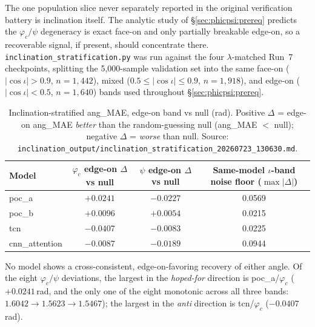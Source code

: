 The one population slice never separately reported in the original verification battery is inclination itself.
The analytic study of \S\ref{sec:phicpsi:prereq} predicts the $\varphi_c/\psi$ degeneracy is exact face-on and only partially breakable edge-on, so a recoverable signal, if present, should concentrate there.
\texttt{inclination\_stratification.py} was run against the four $\lambda$-matched Run~7 checkpoints, splitting the 5{,}000-sample validation set into the same face-on ($|\cos\iota| > 0.9$, $n=1{,}442$), mixed ($0.5 \le |\cos\iota| \le 0.9$, $n=1{,}918$), and edge-on ($|\cos\iota| < 0.5$, $n=1{,}640$) bands used throughout \S\ref{sec:phicpsi:prereq}.

\begin{table}[tbp]
    \centering
    \caption{Inclination-stratified ang\_MAE, edge-on band vs null (rad). Positive $\Delta$ = edge-on ang\_MAE \emph{better} than the random-guessing null (ang\_MAE $<$ null); negative $\Delta$ = \emph{worse} than null.
    Source: \texttt{inclination\_output/inclination\_stratification\_20260723\_130630.md}.}
    \label{tab:phicpsi:inclination}
    \small
    \begin{tabular}{@{}lccc@{}}
        \toprule
        Model & $\varphi_c$ edge-on $\Delta$ vs null & $\psi$ edge-on $\Delta$ vs null & Same-model $\iota$-band noise floor ($\max|\Delta|$) \\
        \midrule
        poc\_a         & $+0.0241$ & $-0.0227$ & 0.0569 \\
        poc\_b         & $+0.0096$ & $+0.0054$ & 0.0215 \\
        tcn            & $-0.0407$ & $-0.0083$ & 0.0225 \\
        cnn\_attention & $-0.0087$ & $-0.0189$ & 0.0944 \\
        \bottomrule
    \end{tabular}
\end{table}

No model shows a cross-consistent, edge-on-favoring recovery of either angle.
Of the eight $\varphi_c/\psi$ deviations, the largest in the \emph{hoped-for} direction is poc\_a/$\varphi_c$ ($+0.0241$\,rad, and the only one of the eight monotonic across all three bands: $1.6042 \to 1.5623 \to 1.5467$); the largest in the \emph{anti} direction is tcn/$\varphi_c$ ($-0.0407$\,rad).

